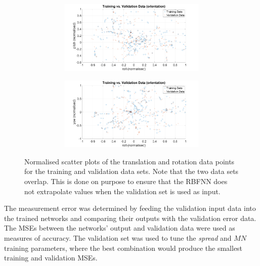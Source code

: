 \begin{figure}
  ~
  \begin{subfigure}{\textwidth}
    \begin{subfigure}{0.48\textwidth}
      \includegraphics[clip, trim = 80 0 80 0, width=\textwidth]{figures/chapter4/tr_v_v_rollpitch}
    \end{subfigure}
    \begin{subfigure}{0.48\textwidth}
      \includegraphics[clip, trim = 80 0 80 0, width=\textwidth]{figures/chapter4/tr_v_v_rollyaw}
    \end{subfigure}
    \caption{}
  \end{subfigure}
  \caption[Scatter plots of the training and validation data. ]{Normalised scatter plots of the translation and rotation data points for the training and validation data sets. Note that the two data sets overlap. This is done on purpose to ensure that the RBFNN does not extrapolate values when the validation set is used as input. }
  \label{fig:chap4-scatter-tr-v}
\end{figure}

The measurement error was determined by feeding the validation input data into the trained networks and comparing their outputs with the validation error data. The MSEs between the networks' output and validation data were used as measures of accuracy. The validation set was used to tune the \emph{spread} and $\mathit{MN}$ training parameters, where the best combination would produce the smallest training and validation MSEs. 

